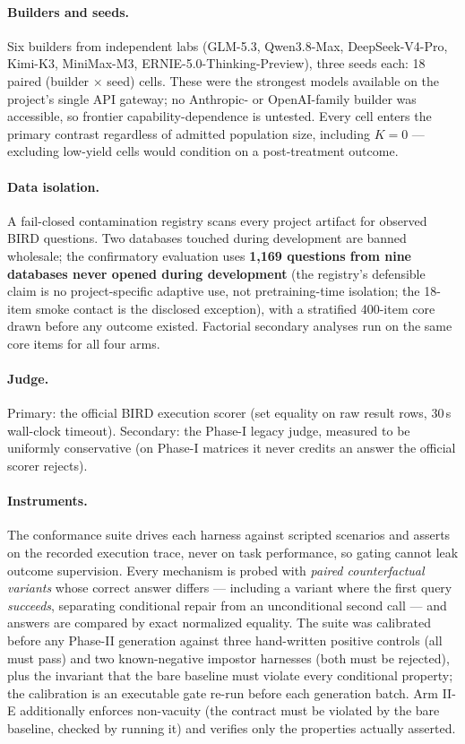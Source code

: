 \paragraph{Builders and seeds.} Six builders from independent labs (GLM-5.3,
Qwen3.8-Max, DeepSeek-V4-Pro, Kimi-K3, MiniMax-M3,
ERNIE-5.0-Thinking-Preview), three seeds each: 18 paired (builder $\times$
seed) cells. These were the strongest models available on the project's single API
gateway; no Anthropic- or OpenAI-family builder was accessible, so frontier
capability-dependence is untested. Every cell enters the primary contrast regardless of admitted
population size, including $K{=}0$ --- excluding low-yield cells would
condition on a post-treatment outcome.

\paragraph{Data isolation.} A fail-closed contamination registry scans every
project artifact for observed BIRD questions. Two databases touched during
development are banned wholesale; the confirmatory evaluation uses
\textbf{1{,}169 questions from nine databases never opened during development}
(the registry's defensible claim is no project-specific adaptive use, not
pretraining-time isolation; the 18-item smoke contact is the disclosed exception), with a
stratified 400-item core drawn before any outcome existed. Factorial
secondary analyses run on the same core items for all four arms.

\paragraph{Judge.} Primary: the official BIRD execution scorer (set
equality on raw result rows, 30\,s wall-clock timeout). Secondary: the
Phase-I legacy judge, measured to be uniformly conservative (on Phase-I
matrices it never credits an answer the official scorer rejects).

\paragraph{Instruments.} The conformance suite drives each harness against
scripted scenarios and asserts on the recorded execution trace, never on
task performance, so gating cannot leak outcome supervision. Every mechanism
is probed with \emph{paired counterfactual variants} whose correct answer
differs --- including a variant where the first query \emph{succeeds},
separating conditional repair from an unconditional second call --- and
answers are compared by exact normalized equality. The suite was calibrated
before any Phase-II generation against three hand-written positive controls
(all must pass) and two known-negative impostor harnesses (both must be
rejected), plus the invariant that the bare baseline must violate every
conditional property; the calibration is an executable gate re-run before
each generation batch. Arm II-E additionally enforces non-vacuity (the
contract must be violated by the bare baseline, checked by running it) and
verifies only the properties actually asserted.

